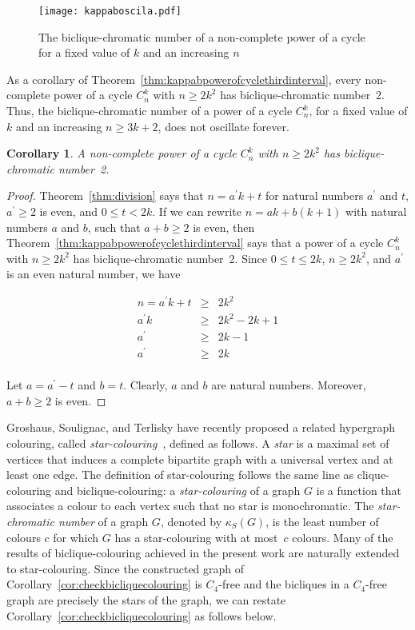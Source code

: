 \documentclass{article}
\newtheorem{corollary}[theorem]{Corollary}
\begin{document}
\begin{figure}[t]
\centering
	\texttt{[image: kappaboscila.pdf]}
	\caption{The biclique-chromatic number of a non-complete power of a cycle for a fixed value
	of $k$ and an increasing $n$}
	\label{fig:kappaboscilacycle}
\end{figure}

As a corollary of Theorem~\ref{thm:kappabpowerofcyclethirdinterval}, every non-complete
power of a cycle $C_{n}^{k}$ with $n \geq 2k^2$ has biclique-chromatic number~2.
Thus, the biclique-chromatic number of a power of a cycle $C_{n}^{k}$, for a fixed
value of $k$ and an increasing $n \geq 3k + 2$, does not oscillate forever.

\begin{corollary}
A non-complete power of a cycle $C_{n}^{k}$ with $n \geq 2k^2$ has biclique-chromatic
number~2. 
\end{corollary}
\begin{proof}
Theorem~\ref{thm:division} says that $n = a^\prime k + t$ for natural numbers
$a^\prime $ and $t$, $a^\prime  \geq 2$ is even, and $0 \leq t < 2k$. If we can rewrite $n =
a k + b(k+1)$ with natural numbers $a$ and $b$, such that $a + b \geq 2$ is
even, then Theorem~\ref{thm:kappabpowerofcyclethirdinterval} says that a power of a cycle
$C_n^k$ with $n \geq 2k^2$ has biclique-chromatic number~2. Since $0 \leq t \leq
2k$, $n \geq 2k^2$, and $a^\prime$ is an even natural number, we have 

\begin{eqnarray*}
 n = a^\prime k + t &\geq& 2k^2     \nonumber \\
     a^\prime k &\geq& 2k^2 - 2k + 1     \nonumber \\
     a^\prime &\geq& 2k - 1     \nonumber \\
     a^\prime &\geq& 2k     \nonumber \\
\end{eqnarray*}

Let $a = a^\prime - t$ and $b = t$. Clearly, $a$ and $b$ are natural numbers. 
Moreover, $a + b \geq 2$ is even.
\end{proof}

Groshaus, Soulignac, and Terlisky have recently proposed a related hypergraph
colouring, called \emph{star-colouring}~\cite{1210.7269}, defined as
follows. A \emph{star} is a maximal set of vertices that induces a
complete bipartite graph with a universal vertex and at least one edge. 
The definition of star-colouring follows the same line as clique-colouring and
biclique-colouring: a \emph{star-colouring} of a graph $G$ is a function that
associates a colour to each vertex such that no star is monochromatic. The 
\emph{star-chromatic number} of a graph $G$, denoted by $\kappa_S(G)$, is the 
least number of colours $c$ for which $G$ has a star-colouring with at most~$c$ 
colours. Many of the results of biclique-colouring
achieved in the present work are naturally extended to star-colouring. Since the
constructed graph of Corollary~\ref{cor:checkbicliquecolouring} is $C_4$-free
and the bicliques in a $C_4$-free graph are precisely the stars of the graph,
we can restate Corollary~\ref{cor:checkbicliquecolouring} as follows below.
\end{document}
